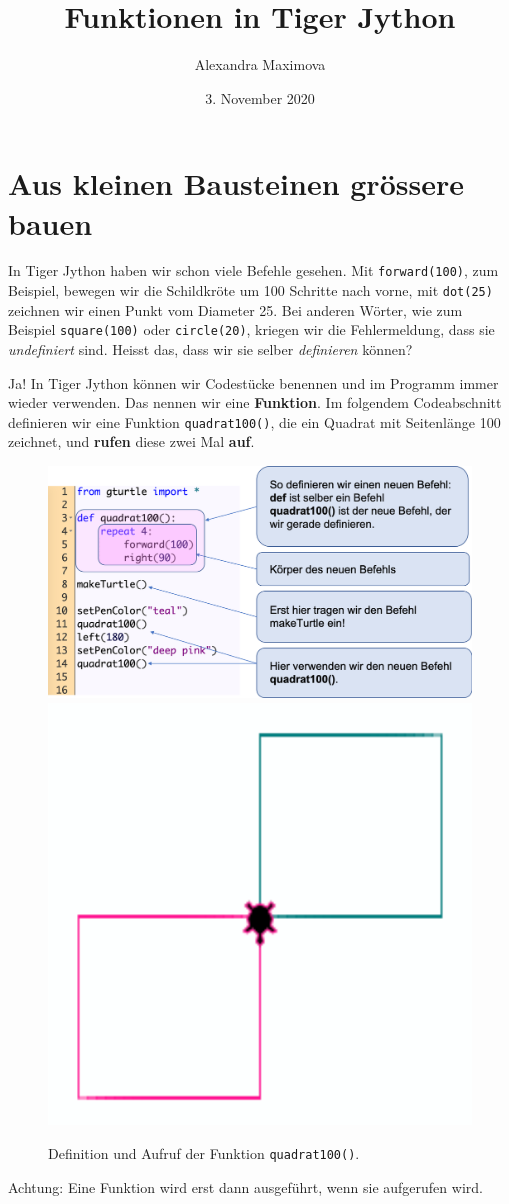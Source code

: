 \documentclass{article}
\title{Funktionen in Tiger Jython}
\author{Alexandra Maximova}
\date{3. November 2020}
\begin{document}
\maketitle


\section{Aus kleinen Bausteinen grössere bauen} \label{section-ohne-parameter}

In Tiger Jython haben wir schon viele Befehle gesehen. Mit \lstinline|forward(100)|, zum Beispiel, bewegen wir die Schildkröte um 100 Schritte nach vorne, mit \lstinline|dot(25)| zeichnen wir einen Punkt vom Diameter 25. Bei anderen Wörter, wie zum Beispiel \lstinline|square(100)| oder \lstinline|circle(20)|, kriegen wir die Fehlermeldung, dass sie \emph{undefiniert} sind. Heisst das, dass wir sie selber \emph{definieren} können?

Ja! In Tiger Jython können wir Codestücke benennen und im Programm immer wieder verwenden. Das nennen wir eine \textbf{Funktion}. Im folgendem Codeabschnitt definieren wir eine Funktion \lstinline|quadrat100()|, die ein Quadrat mit Seitenlänge 100 zeichnet, und \textbf{rufen} diese zwei Mal \textbf{auf}.

\begin{figure}[H]
\centering
\includegraphics[width=0.6\linewidth]{pictures/definition_of_new_functions.png}
\includegraphics[width=0.3\linewidth]{pictures/def_example_picture.png}
\caption{Definition und Aufruf der Funktion \lstinline|quadrat100()|.} 
\end{figure}

Achtung: Eine Funktion wird erst dann ausgeführt, wenn sie aufgerufen wird.
\end{document}
